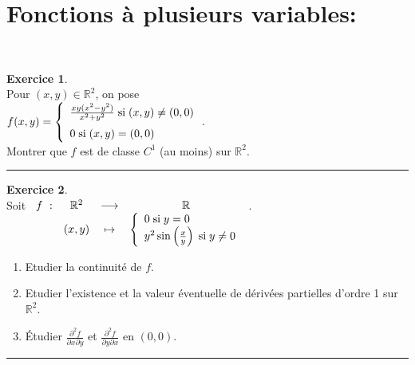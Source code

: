 \documentclass[a4paper,10pt]{article}
\theoremstyle{definition}
\theoremstyle{definition}
\newtheorem{exo}{Exercice}
\newcommand{\R}{\mathbb{R}}
\begin{document}
\section*{Fonctions à plusieurs variables:}\hfill\\%
\begin{minipage}{1\linewidth}
	\begin{minipage}[t]{0.48\linewidth}
		\raggedright
		
		\begin{exo}\quad\\[0.2cm]
			Pour  $(x,y)\in\R^2$, on pose \\[0.2cm]$f(x,y) =\left\{
			\begin{array}{l}
			\frac{xy(x^2-y^2)}{x^2+y^2}\;\text{si}\;(x,y)\neq(0,0)\\
			\rule{0mm}{5mm}0\;\text{si}\;(x,y)=(0,0)
			\end{array}
			\right.$.\hfil\\[0.2cm] Montrer que $f$ est de classe $C^1$ (au moins) sur $\R^2$.
			
			
			\centering
			\rule{1\linewidth}{0.6pt}
		\end{exo}
		
		\begin{exo}\quad\\[0.2cm]
			Soit $\begin{array}[t]{cccc}f~:&\R^2&\longrightarrow&\R\\
			&(x,y)&\mapsto&\left\{
			\begin{array}{l}
			0\;\text{si}\;y=0\\
			y^2\sin\left(\frac{x}{y}\right)\;\text{si}\;y\neq0
			\end{array}
			\right.
			\end{array}
			$.
			\begin{enumerate}
				\item  Etudier la continuité de $f$.
				
				\item  Etudier l'existence et la valeur éventuelle de dérivées partielles d'ordre 1 sur $\R^2$.
				\item Étudier $\frac{\partial^2f}{\partial x\partial y}$ et $\frac{\partial^2f}{\partial y\partial x}$ en $(0,0)$.
			\end{enumerate}
			
			\centering
			\rule{1\linewidth}{0.6pt}
		\end{exo}
		
		
	\end{minipage}	
	\hfill\vrule\hfill
	\begin{minipage}[t]{0.48\linewidth}
		\raggedright
		

\end{minipage}
\end{minipage}
\end{document}
